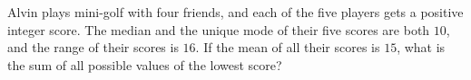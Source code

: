 Alvin plays mini-golf with four friends, and each of the five players gets a positive integer score. The median and the unique mode of their five scores are both $10$, and the range of their scores is $16$. If the mean of all their scores is $15$, what is the sum of all possible values of the lowest score?
